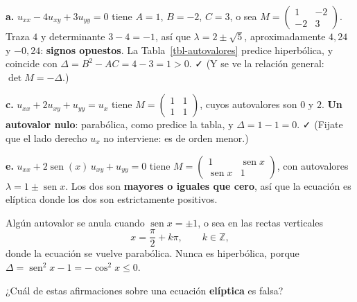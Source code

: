 \documentclass[
  spanish,
  a4paper,
]{scrbook}
\theoremstyle{definition}
\theoremstyle{plain}
\theoremstyle{definition}
\theoremstyle{plain}
\theoremstyle{definition}
\theoremstyle{remark}
\begin{document}
\begin{tcolorbox}[enhanced jigsaw, arc=.35mm, bottomrule=.15mm, bottomtitle=1mm, breakable, colback=white, colbacktitle=quarto-callout-tip-color!10!white, colframe=quarto-callout-tip-color-frame, coltitle=black, left=2mm, leftrule=.75mm, opacityback=0, opacitybacktitle=0.6, rightrule=.15mm, title=\textcolor{quarto-callout-tip-color}{\faLightbulb}\hspace{0.5em}{Solución}, titlerule=0mm, toprule=.15mm, toptitle=1mm]

\textbf{a.} \(u_{xx}-4u_{xy}+3u_{yy}=0\) tiene \(A=1\), \(B=-2\),
\(C=3\), o sea \(M = \begin{pmatrix} 1 & -2\\ -2 & 3\end{pmatrix}\).
Traza \(4\) y determinante \(3-4=-1\), así que
\(\lambda = 2 \pm \sqrt{5}\), aproximadamente \(4{,}24\) y \(-0{,}24\):
\textbf{signos opuestos}. La Tabla~\ref{tbl-autovalores} predice
hiperbólica, y coincide con \(\Delta = B^2-AC = 4-3 = 1 > 0\). ✓ (Y se
ve la relación general: \(\det M = -\Delta\).)

\textbf{c.} \(u_{xx}+2u_{xy}+u_{yy}=u_x\) tiene
\(M = \begin{pmatrix} 1&1\\1&1\end{pmatrix}\), cuyos autovalores son
\(0\) y \(2\). \textbf{Un autovalor nulo}: parabólica, como predice la
tabla, y \(\Delta = 1-1 = 0\). ✓ (Fijate que el lado derecho \(u_x\) no
interviene: es de orden menor.)

\textbf{e.} \(u_{xx}+2\operatorname{sen}(x)\,u_{xy}+u_{yy}=0\) tiene
\(M = \begin{pmatrix} 1 & \operatorname{sen}x\\ \operatorname{sen}x & 1\end{pmatrix}\),
con autovalores \(\lambda = 1 \pm \operatorname{sen}x\). Los dos son
\textbf{mayores o iguales que cero}, así que la ecuación es elíptica
donde los dos son estrictamente positivos.

Algún autovalor se anula cuando \(\operatorname{sen}x = \pm 1\), o sea
en las rectas verticales
\[x = \frac{\pi}{2} + k\pi, \qquad k \in \mathbb{Z},\] donde la ecuación
se vuelve parabólica. Nunca es hiperbólica, porque
\(\Delta = \operatorname{sen}^2x - 1 = -\cos^2 x \le 0\).

\end{tcolorbox}

¿Cuál de estas afirmaciones sobre una ecuación \textbf{elíptica} es
falsa?
\end{document}
